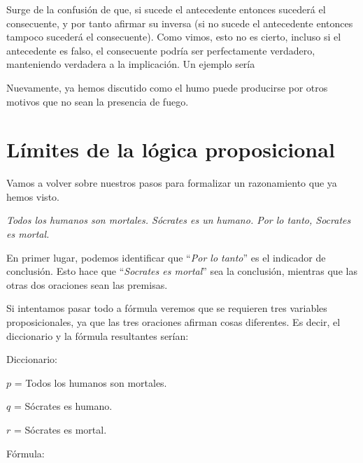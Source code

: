 Surge de la confusión de que, si sucede el antecedente entonces sucederá el
consecuente, y por tanto afirmar su inversa (si no sucede el antecedente
entonces tampoco sucederá el consecuente). Como vimos, esto no es cierto,
incluso si el antecedente es falso, el consecuente podría ser perfectamente
verdadero, manteniendo verdadera a la implicación. Un ejemplo sería

\begin{minipage}{0.5\textwidth}
    \begin{lreasoning}
    \end{lreasoning}
\end{minipage}

Nuevamente, ya hemos discutido como el humo puede producirse por otros motivos
que no sean la presencia de fuego.

\section{Límites de la lógica proposicional}
\label{chap:logica_proposicional:sec:limites}

Vamos a volver sobre nuestros pasos para formalizar un razonamiento que ya hemos
visto.

\begin{example}
    \textit{Todos los humanos son mortales. Sócrates es un humano. Por lo tanto, Socrates es mortal.}
\end{example}

En primer lugar, podemos identificar que ``\textit{Por lo tanto}'' es el
indicador de conclusión. Esto hace que ``\textit{Socrates es mortal}'' sea la
conclusión, mientras que las otras dos oraciones sean las premisas.

Si intentamos pasar todo a fórmula veremos que se requieren tres variables
proposicionales, ya que las tres oraciones afirman cosas diferentes. Es decir,
el diccionario y la fórmula resultantes serían:

\begin{example}
    \sindent Diccionario:

    \dindent $p$ = Todos los humanos son mortales.

    \dindent $q$ = Sócrates es humano.

    \dindent $r$ = Sócrates es mortal.

    \sindent Fórmula:

    \begin{lreasoning}[width=0.6\textwidth,margin=\value{dindentwidth} pt]
    \end{lreasoning}
\end{example}


